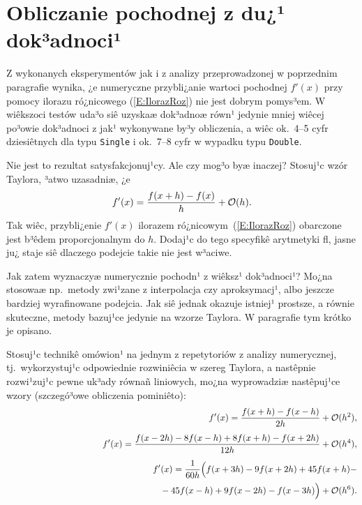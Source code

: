 \documentclass[11pt,leqno]{article}
\newcommand{\eqref}[1]{{\rm (\ref{#1})}}
\begin{document}
\section{Obliczanie pochodnej z du¿¹ dok³adnoci¹}          \label{S:Obliczanie}
\setcounter{equation}{0}


Z wykonanych eksperymentów jak i z analizy przeprowadzonej w poprzednim
paragrafie wynika, ¿e numeryczne przybli¿anie wartoci pochodnej $f'(x)$
przy pomocy ilorazu ró¿nicowego \eqref{E:IlorazRoz} nie jest dobrym pomys³em.
W wiêkszoci testów uda³o siê uzyskaæ dok³adnoæ równ¹ jedynie mniej wiêcej
po³owie dok³adnoci z jak¹ wykonywane by³y obliczenia, a wiêc ok.~4--5 cyfr
dziesiêtnych dla typu \texttt{Single} i ok.~7--8 cyfr w wypadku typu
\texttt{Double}. 

Nie jest to rezultat satysfakcjonuj¹cy. Ale czy mog³o byæ inaczej? Stosuj¹c
wzór Taylora, ³atwo uzasadniæ, ¿e
$$
f'(x)=\frac{f(x+h)-f(x)}{h}+{\cal O}(h).
$$
Tak wiêc, przybli¿enie $f'(x)$ ilorazem ró¿nicowym~\eqref{E:IlorazRoz} obarczone
jest b³êdem proporcjonalnym do $h$. Dodaj¹c do tego specyfikê arytmetyki
\textsf{fl}, jasne ju¿ staje siê dlaczego podejcie takie nie jest w³aciwe.

Jak zatem wyznaczyæ numerycznie pochodn¹ z wiêksz¹ dok³adnoci¹? Mo¿na stosowaæ
np.~metody zwi¹zane z interpolacja czy aproksymacj¹, albo jeszcze bardziej
wyrafinowane podejcia. Jak siê jednak okazuje istniej¹ prostsze, a równie
skuteczne, metody bazuj¹ce jedynie na wzorze Taylora. W paragrafie tym
krótko je opisano.

Stosuj¹c technikê omówion¹ na jednym z repetytoriów z analizy numerycznej, 
tj.~wykorzystuj¹c odpowiednie rozwiniêcia w szereg Taylora, a nastêpnie
rozwi¹zuj¹c pewne uk³ady równañ liniowych, mo¿na wyprowadziæ nastêpuj¹ce wzory
(szczegó³owe obliczenia pominiêto):
\begin{eqnarray*}
&&f'(x)=\frac{f(x+h)-f(x-h)}{2h}+{\cal O}(h^2),\\[1ex]
&&f'(x)=\frac{f(x-2h)-8f(x-h)+8f(x+h)-f(x+2h)}{12h}+{\cal O}(h^4),\\[1ex]
&&f'(x)=\frac{1}{60h}\Big(f(x+3h)-9f(x+2h)+45f(x+h)-\\
&&\phantom{f'(x)=\frac{1}{60h}\Big(f(x+3h)-9f(x+2h)}
                          -45f(x-h)+9f(x-2h)-f(x-3h)\Big)+{\cal O}(h^6).							      
\end{eqnarray*}
\end{document}
